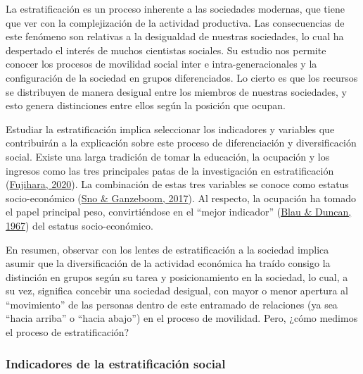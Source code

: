\documentclass[
]{article}
\begin{document}
La estratificación es un proceso inherente a las sociedades modernas, que tiene que ver con la complejización de la actividad productiva. Las consecuencias de este fenómeno son relativas a la desigualdad de nuestras sociedades, lo cual ha despertado el interés de muchos cientistas sociales. Su estudio nos permite conocer los procesos de movilidad social inter e intra-generacionales y la configuración de la sociedad en grupos diferenciados. Lo cierto es que los recursos se distribuyen de manera desigual entre los miembros de nuestras sociedades, y esto genera distinciones entre ellos según la posición que ocupan.

Estudiar la estratificación implica seleccionar los indicadores y variables que contribuirán a la explicación sobre este proceso de diferenciación y diversificación social. Existe una larga tradición de tomar la educación, la ocupación y los ingresos como las tres principales patas de la investigación en estratificación (\protect\hyperlink{ref-Fujihara2020}{Fujihara, 2020}). La combinación de estas tres variables se conoce como estatus socio-económico (\protect\hyperlink{ref-Sno.Ganzeboom2017}{Sno \& Ganzeboom, 2017}). Al respecto, la ocupación ha tomado el papel principal peso, convirtiéndose en el ``mejor indicador'' (\protect\hyperlink{ref-Blau.Duncan1967}{Blau \& Duncan, 1967}) del estatus socio-económico.

En resumen, observar con los lentes de estratificación a la sociedad implica asumir que la diversificación de la actividad económica ha traído consigo la distinción en grupos según su tarea y posicionamiento en la sociedad, lo cual, a su vez, significa concebir una sociedad desigual, con mayor o menor apertura al ``movimiento'' de las personas dentro de este entramado de relaciones (ya sea ``hacia arriba'' o ``hacia abajo'') en el proceso de movilidad. Pero, ¿cómo medimos el proceso de estratificación?

\hypertarget{indicadores-de-la-estratificaciuxf3n-social}{%
\subsubsection{Indicadores de la estratificación social}\label{indicadores-de-la-estratificaciuxf3n-social}}
\end{document}
